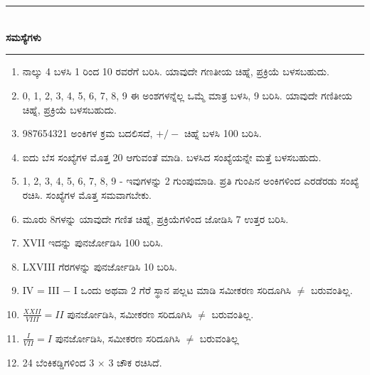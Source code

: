 \chapter[ಅಧ್ಯಾಯ 2]{}\label{chap2}

\begin{center}
\rule{5cm}{1pt}\\[5pt]
{\Large\bfseries ಸಮಸ್ಯೆಗಳು}\\[3pt]
\rule{5cm}{1pt}
\end{center}

\smallskip
\begin{enumerate}
\renewcommand{\labelenumi}{\bf\theenumi.}
\itemsep=5pt
\item ನಾಲ್ಕು 4 ಬಳಸಿ 1 ರಿಂದ 10 ರವರೆಗೆ ಬರಿಸಿ. ಯಾವುದೇ ಗಣತೀಯ ಚಿಹ್ನೆ, ಪ್ರಕ್ರಿಯೆ ಬಳಸಬಹುದು.

\item 0, 1, 2, 3, 4, 5, 6, 7, 8, 9 ಈ ಅಂಶಗಳನ್ನೆಲ್ಲ ಒಮ್ಮೆ ಮಾತ್ರ ಬಳಸಿ, 9 ಬರಿಸಿ. ಯಾವುದೇ ಗಣಿತೀಯ ಚಿಹ್ನೆ, ಪ್ರಕ್ರಿಯೆ ಬಳಸಬಹುದು. 

\item 987654321 ಅಂಕಿಗಳ ಕ್ರಮ ಬದಲಿಸದೆ, $+/-$ ಚಿಹ್ನೆ ಬಳಸಿ 100 ಬರಿಸಿ.

\item ಐದು ಬೆಸ ಸಂಖ್ಯೆಗಳ ಮೊತ್ತ 20 ಆಗುವಂತೆ ಮಾಡಿ. ಬಳಸಿದ ಸಂಖ್ಯೆಯನ್ನೇ ಮತ್ತೆ ಬಳಸಬಹುದು. 

\item 1, 2, 3, 4, 5, 6, 7, 8, 9 - ಇವುಗಳನ್ನು 2 ಗುಂಪುಮಾಡಿ. ಪ್ರತಿ ಗುಂಪಿನ ಅಂಕಿ\break ಗಳಿಂದ ಎರಡೆರಡು ಸಂಖ್ಯೆ ರಚಿಸಿ. ಸಂಖ್ಯೆಗಳ ಮೊತ್ತ ಸಮವಾಗಬೇಕು. 

\item ಮೂರು 8ಗಳನ್ನು ಯಾವುದೇ ಗಣಿತ ಚಿಹ್ನೆ, ಪ್ರಕ್ರಿಯೆಗಳಿಂದ ಜೋಡಿಸಿ 7 ಉತ್ತರ ಬರಿಸಿ.

\item XVII ಇದನ್ನು ಪುನರ್ಜೋಡಿಸಿ 100 ಬರಿಸಿ.

\item LXVIII ಗೆರಗಳನ್ನು ಪುನರ್ಜೋಡಿಸಿ 10 ಬರಿಸಿ. 

\item IV = III $-$ I ಒಂದು ಅಥವಾ 2 ಗೆರೆ ಸ್ಥಾನ ಪಲ್ಲಟ ಮಾಡಿ ಸಮೀಕರಣ ಸರಿದೂಗಿಸಿ $\neq$ ಬರುವಂತಿಲ್ಲ.

\item $\frac{XXII}{VIII} = II$ ಪುನರ್ಜೋಡಿಸಿ, ಸಮೀಕರಣ ಸರಿದೂಗಿಸಿ $\neq$ ಬರುವಂತಿಲ್ಲ.

\item $\frac{I}{VII} = I$ ಪುನರ್ಜೋಡಿಸಿ, ಸಮೀಕರಣ ಸರಿದೂಗಿಸಿ $\neq$ ಬರುವಂತಿಲ್ಲ

\item 24 ಬೆಂಕಿಕಡ್ಡಿಗಳಿಂದ 3 $\times$ 3 ಚೌಕ ರಚಿಸಿದೆ.


\end{enumerate}
